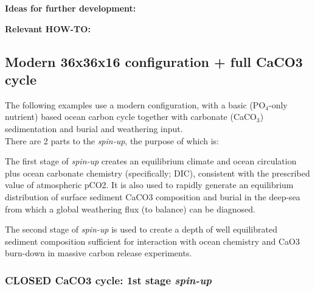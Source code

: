 \documentclass[10pt,twoside]{article}
\begin{document}
\noindent \textbf{Ideas for further development:} 

\noindent \textbf{Relevant HOW-TO:}


\subsection{Modern 36x36x16 configuration + full CaCO3 cycle}\label{EXAMPLE.worjh2.Archeretal2009.SPIN}

The following examples use a modern configuration, with a basic (PO$_{4}$-only nutrient) based ocean carbon cycle together with carbonate (CaCO$_{3}$) sedimentation and burial and weathering input.
\\ There are 2 parts to the \textit{spin-up}, the purpose of which is:

        \begin{compactenum}
        
                \item The first stage of \textit{spin-up} creates an equilibrium climate and ocean circulation plus ocean carbonate chemistry (specifically; DIC), consistent with the prescribed value of atmospheric pCO2. It is also used to rapidly generate an equilibrium distribution of surface sediment CaCO3 composition and burial in the deep-sea from which a global weathering flux (to balance) can be diagnosed.
                
                \item The second stage of \textit{spin-up} is used to create a depth of well equilibrated sediment composition sufficient for interaction with ocean chemistry and CaO3 burn-down in massive carbon release experiments.
                                
        \end{compactenum}


\subsubsection{CLOSED CaCO3 cycle: 1st stage \textit{spin-up}}\label{EXAMPLE.worjh2.Archeretal2009.SPIN1}
\end{document}
